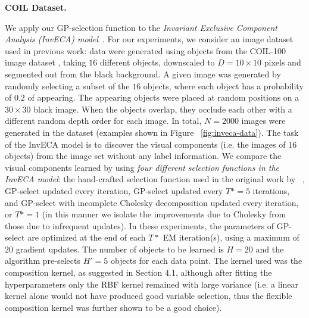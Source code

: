\documentclass[12pt]{article}
\begin{document}
\textbf{COIL Dataset.}
%
\begin{figure*}[t!]
\caption{COIL Dataset \citep{coil100}: 
A handful of data points used in experiments with the Translation Invariant Occlusive (InvECA) model, showing the occluding objects to be learned. }
\label{fig:inveca-data}
\end{figure*}
%
We apply our GP-selection function to the \emph{Invariant Exclusive Component Analysis (InvECA) model}~\citep{DaiLucke2012b,DaiEtAl2013}.
For our experiments, we consider an image dataset used in previous work: data were generated using objects from the COIL-100 image dataset \citep{coil100}, taking $16$ different objects, downscaled to $D=10 \times 10$ pixels and segmented out from the black background.
A given image was generated by randomly selecting a subset of the $16$ objects, where each object has a probability of $0.2$ of appearing.
The appearing objects were placed at random positions on a $30 \times 30$ black image.
When the objects overlap, they occlude each other with a different random depth order for each image.
In total, $N=2000$ images were generated in the dataset (examples shown in Figure~ \ref{fig:inveca-data}).
The task of the InvECA model is to discover the visual components (i.e. the images of $16$ objects) from the image set without any label information. 
We compare the visual components learned by using \emph{four different selection functions in the InvECA model}: the hand-crafted selection function used in the original work by ~\citet{DaiLucke2012b}, GP-select updated every iteration, GP-select updated every $T*=5$ iterations, and GP-select with incomplete Cholesky decomposition updated every iteration, or $T\ast=1$ (in this manner we isolate the improvements due to Cholesky from those due to infrequent updates). 
In these experiments, the parameters of GP-select are optimized at the end of each $T*$ EM iteration(s), using a maximum of $20$ gradient updates.
The number of objects to be learned is $H=20$ and the algorithm pre-selects $H'=5$ objects for each data point.
The kernel used was the composition kernel, as suggested in Section 4.1, although after fitting the hyperparameters only the RBF kernel remained with large variance (i.e. a linear kernel alone would not have produced good variable selection, thus the flexible composition kernel was further shown to be a good choice).
\end{document}
